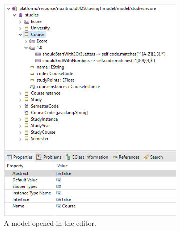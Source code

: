 \begin{figure}
    \centering
    \begin{subfigure}[b]{.45\textwidth}
        \centering
        \includegraphics[width=\textwidth]{figures/ecore-sample-reflective-ecore-model-editor}
        \caption{A model opened in the editor.}
        \label{sfig:sample-reflective-ecore-model-screenshot}
    \end{subfigure}
    \hfill
    \begin{subfigure}[b]{.45\textwidth}
        \centering

\end{subfigure}
\end{figure}
